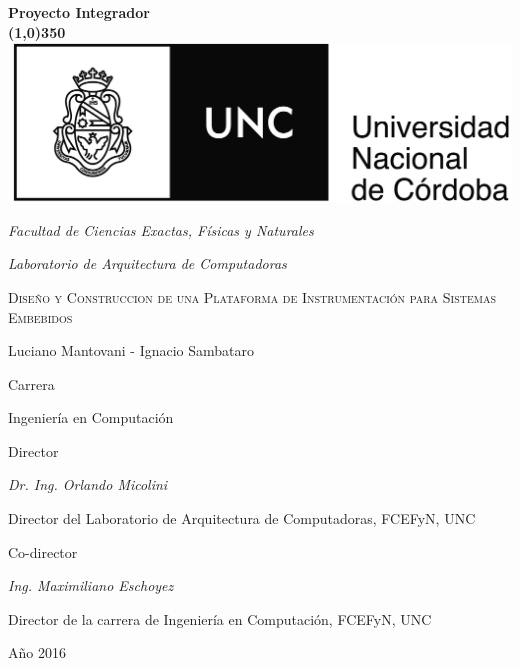 \documentclass[a4paper]{report}
\date{}
\begin{document}
\begin{titlepage}
    \centering
    \textbf{\huge{Proyecto Integrador} \\ \line(1,0){350}} \\
    \vspace{0.5cm}\includegraphics[scale=0.53]{Escudo.jpg}\\
    \vspace{0.15cm}
    {\large\itshape Facultad de Ciencias Exactas, Físicas y Naturales\par}
    \vspace{0.15cm}
    {\large\itshape Laboratorio de Arquitectura de Computadoras\par}
    \vspace{1cm}
    {\scshape\Huge Diseño y Construccion de una Plataforma de Instrumentación para Sistemas Embebidos\par}
    \vspace{1cm}
    {\Large Luciano Mantovani - Ignacio Sambataro\par}
    \vspace{1.5cm}
    {\large Carrera\par}
    \vspace{0.10cm}
    {\large Ingeniería en Computación\par}
    \vspace{1cm}
    {\large Director\par}
    \vspace{0.10cm}
    {\large\itshape Dr. Ing. Orlando Micolini\par}
    {Director del Laboratorio de Arquitectura de Computadoras, FCEFyN, UNC\par}
    \vspace{1cm}
    {\large Co-director\par}
    \vspace{0.10cm}
    {\large\itshape Ing. Maximiliano Eschoyez\par}
    {Director de la carrera de Ingeniería en Computación, FCEFyN, UNC\par}

    \vfill

    {\large Año 2016 \par}
\end{titlepage}
\end{document}
